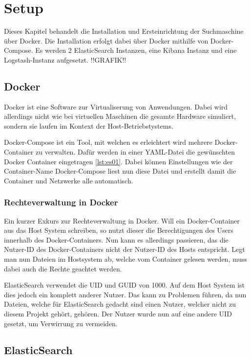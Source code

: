 \chapter{Setup}

Dieses Kapitel behandelt die Installation und Ersteinrichtung der Suchmaschine über Docker. Die Installation erfolgt dabei über Docker mithilfe von Docker-Compose. Es werden 2 ElasticSearch Instanzen, eine Kibana Instanz und eine Logstash-Instanz aufgesetzt. !!GRAFIK!!

\section{Docker}

Docker ist eine Software zur Virtualiserung von Anwendungen. Dabei wird allerdings nicht wie bei virtuellen Maschinen die gesamte Hardware simuliert, sondern sie laufen im Kontext der Host-Betriebstystems.

Docker-Compose ist ein Tool, mit welchen es erleichtert wird mehrere Docker-Container zu verwalten. Dafür werden in einer YAML-Datei die gewünschten Docker Container eingetragen \ref{lst:es01}. Dabei können Einstellungen wie der Container-Name Docker-Compose liest nun diese Datei und erstellt damit die Container und Netzwerke alle automatisch.

\subsection{Rechteverwaltung in Docker}

Ein kurzer Exkurs zur Rechteverwaltung in Docker. Will ein Docker-Container aus das Host System schreiben, so nutzt dieser die Berechtigungen des Users innerhalb des Docker-Containers. Nun kann es allerdings passieren, das die Nutzer-ID des Docker-Containers nicht der Nutzer-ID des Hosts entspricht. Legt man nun Dateien im Hostsystem ab, welche vom Container gelesen werden, muss dabei auch die Rechte geachtet werden. 

ElasticSearch verwendet die UID und GUID von 1000. Auf dem Host System ist dies jedoch ein komplett anderer Nutzer. Das kann zu Problemen führen, da nun Dateien, welche für ElasticSearch gedacht sind einen Nutzer, welcher nicht zu diesem Projekt gehört, gehören. Der Nutzer wurde nun auf eine andere UID gesetzt, um Verwirrung zu vermeiden. \cite{JarrodWeaver.2014}

\section{ElasticSearch}

